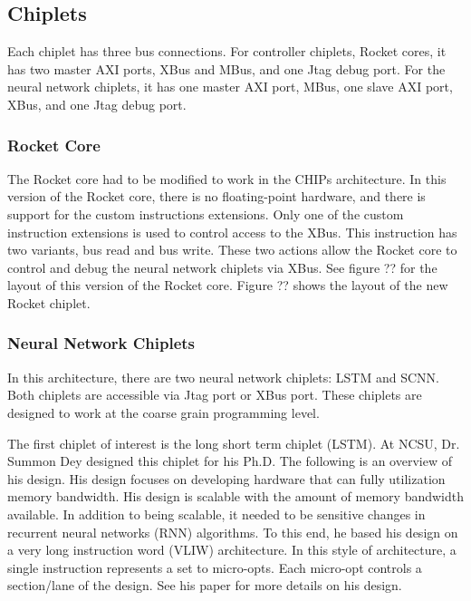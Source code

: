 \documentclass[../main.tex]{subfiles}
\begin{document}
\subsection{Chiplets}
Each chiplet has three bus connections. For controller chiplets, Rocket cores, it has two master AXI ports, XBus and MBus, and one Jtag debug port. For the neural network chiplets, it has one master AXI port, MBus, one slave AXI port, XBus, and one Jtag debug port.

\subsubsection{Rocket Core}
The Rocket core had to be modified to work in the CHIPs architecture. In this version of the Rocket core, there is no floating-point hardware, and there is support for the custom instructions extensions. Only one of the custom instruction extensions is used to control access to the XBus. This instruction has two variants, bus read and bus write. These two actions allow the Rocket core to control and debug the neural network chiplets via XBus. See figure ?? for the layout of this version of the Rocket core. Figure ?? shows the layout of the new Rocket chiplet.
\subsubsection{Neural Network Chiplets}
In this architecture, there are two neural network chiplets: LSTM and SCNN. Both chiplets are accessible via Jtag port or XBus port. These chiplets are designed to work at the coarse grain programming level. 

The first chiplet of interest is the long short term chiplet (LSTM). At NCSU, Dr. Summon Dey designed this chiplet for his Ph.D. The following is an overview of his design. His design focuses on developing hardware that can fully utilization memory bandwidth. His design is scalable with the amount of memory bandwidth available. In addition to being scalable, it needed to be sensitive changes in recurrent neural networks (RNN) algorithms. To this end, he based his design on a very long instruction word (VLIW) architecture. In this style of architecture, a single instruction represents a set to micro-opts. Each micro-opt controls a section/lane of the design. See his paper for more details on his design\cite{Summon-Dey-LSTM}. 
\end{document}
